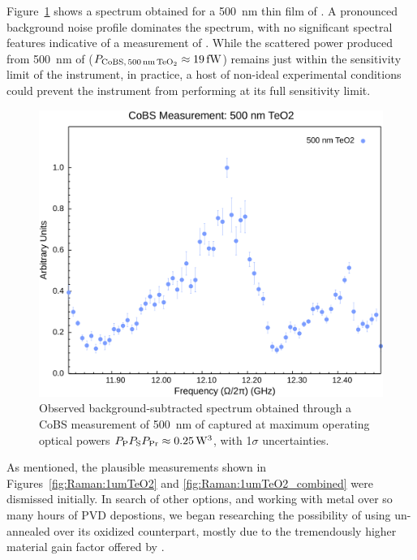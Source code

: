 Figure~\ref{fig:Raman:500nmTeO2} shows a spectrum obtained for a \SI{500}{\nano\meter} thin film of . A pronounced background noise profile dominates the spectrum, with no significant spectral features indicative of a measurement of . While the scattered power produced from \SI{500}{\nano\meter} of  (\(P_{\rm CoBS,\,\SI{500}{\nano\meter}\,\ce{TeO2}} \approx \SI{19}{\femto\watt}\)) remains just within the sensitivity limit of the instrument, in practice, a host of non-ideal experimental conditions could prevent the instrument from performing at its full sensitivity limit.

\begin{figure}[t]
  \centering
  \hspace{-2em}\includegraphics[width=.85\textwidth]{figs/4-Raman/CoBS Measurement: 500 nm TeO2.png}
  \caption[Observed spectrum obtained through a \ac{CoBS} measurement of \SI{500}{\nano\meter} of .]{Observed background-subtracted spectrum obtained through a \ac{CoBS} measurement of \SI{500}{\nano\meter} of  captured at maximum operating optical powers \(P_{\rm P}P_{\rm S}P_{\rm Pr} \approx \SI{0.25}{\cubic\watt}\), with 1\(\sigma\) uncertainties.}
  \label{fig:Raman:500nmTeO2}
\end{figure}

As mentioned, the plausible measurements shown in Figures~\ref{fig:Raman:1umTeO2} and \ref{fig:Raman:1umTeO2_combined} were dismissed initially. In search of other options, and working with  metal over so many hours of \ac{PVD} depostions, we began researching the possibility of using un-annealed  over its oxidized counterpart, mostly due to the tremendously higher material gain factor offered by .

